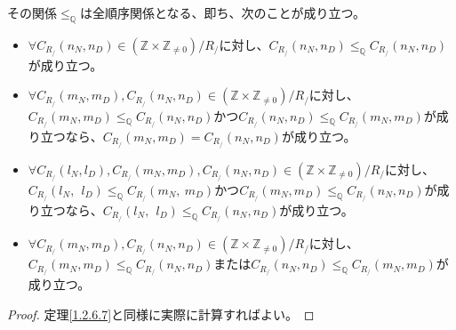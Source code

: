 \documentclass[dvipdfmx]{jsarticle}
\begin{document}
\begin{thm}\label{1.2.6.17}
その関係$\leq_{\mathbb{Q}}$は全順序関係となる、即ち、次のことが成り立つ。
\begin{itemize}
\item
  $\forall C_{R_{/}}\left( n_{N},n_{D} \right) \in \left( \mathbb{Z} \times \mathbb{Z}_{\neq 0} \right) /R_{/} $に対し、$C_{R_{/}}\left( n_{N},n_{D} \right) \leq_{\mathbb{Q}}C_{R_{/}}\left( n_{N},n_{D} \right)$が成り立つ。
\item
  $\forall C_{R_{/}}\left( m_{N},m_{D} \right),C_{R_{/}}\left( n_{N},n_{D} \right) \in \left( \mathbb{Z} \times \mathbb{Z}_{\neq 0} \right) /R_{/} $に対し、$C_{R_{/}}\left( m_{N},m_{D} \right) \leq_{\mathbb{Q}}C_{R_{/}}\left( n_{N},n_{D} \right)$かつ$C_{R_{/}}\left( n_{N},n_{D} \right) \leq_{\mathbb{Q}}C_{R_{/}}\left( m_{N},m_{D} \right)$が成り立つなら、$C_{R_{/}}\left( m_{N},m_{D} \right) = C_{R_{/}}\left( n_{N},n_{D} \right)$が成り立つ。
\item
  $\forall C_{R_{/}}\left( l_{N},l_{D} \right),C_{R_{/}}\left( m_{N},m_{D} \right),C_{R_{/}}\left( n_{N},n_{D} \right) \in \left( \mathbb{Z} \times \mathbb{Z}_{\neq 0} \right) /R_{/} $に対し、$C_{R_{/}}\left( l_{N},\ \ l_{D} \right) \leq_{\mathbb{Q}}C_{R_{/}}\left( m_{N},\ m_{D} \right)$かつ$C_{R_{/}}\left( m_{N},m_{D} \right) \leq_{\mathbb{Q}}C_{R_{/}}\left( n_{N},n_{D} \right)$が成り立つなら、$C_{R_{/}}\left( l_{N},\ \ l_{D} \right) \leq_{\mathbb{Q}}C_{R_{/}}\left( n_{N},n_{D} \right)$が成り立つ。
\item
  $\forall C_{R_{/}}\left( m_{N},m_{D} \right),C_{R_{/}}\left( n_{N},n_{D} \right) \in \left( \mathbb{Z} \times \mathbb{Z}_{\neq 0} \right) /R_{/} $に対し、$C_{R_{/}}\left( m_{N},m_{D} \right) \leq_{\mathbb{Q}}C_{R_{/}}\left( n_{N},n_{D} \right)$または$C_{R_{/}}\left( n_{N},n_{D} \right) \leq_{\mathbb{Q}}C_{R_{/}}\left( m_{N},m_{D} \right)$が成り立つ。
\end{itemize}
\end{thm}
\begin{proof}
定理\ref{1.2.6.7}と同様に実際に計算すればよい。
\end{proof}
\end{document}
